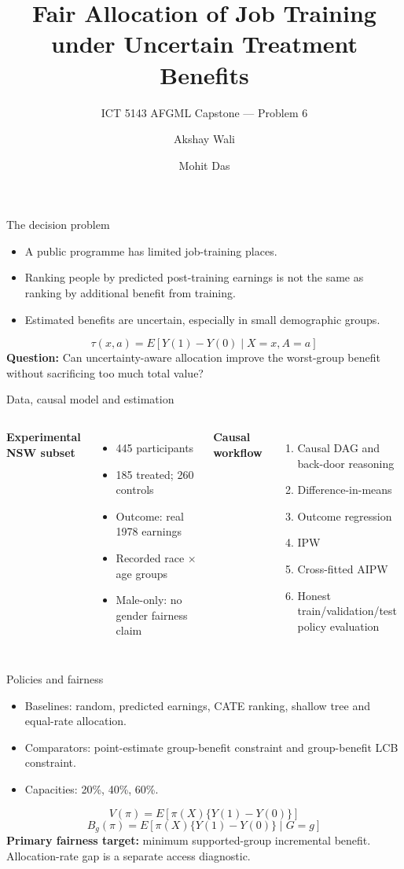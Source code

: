 \documentclass[aspectratio=169,10pt]{beamer}
\title{Fair Allocation of Job Training under Uncertain Treatment Benefits}
\subtitle{ICT 5143 AFGML Capstone — Problem 6}
\author{Akshay Wali \and Mohit Das}
\institute{261090830018 \quad $\vert$ \quad 261090840018}
\date{}
\begin{document}
\begin{frame}
\titlepage
\end{frame}

\begin{frame}{The decision problem}
\begin{itemize}
\item A public programme has limited job-training places.
\item Ranking people by predicted post-training earnings is not the same as ranking by additional benefit from training.
\item Estimated benefits are uncertain, especially in small demographic groups.
\end{itemize}
\vspace{0.4em}
\[
\tau(x,a)=E[Y(1)-Y(0)\mid X=x,A=a]
\]
\centering
\textbf{Question:} Can uncertainty-aware allocation improve the worst-group benefit without sacrificing too much total value?
\end{frame}

\begin{frame}{Data, causal model and estimation}
\begin{columns}[T]
\textbf{Experimental NSW subset}
\begin{itemize}
\item 445 participants
\item 185 treated; 260 controls
\item Outcome: real 1978 earnings
\item Recorded race $\times$ age groups
\item Male-only: no gender fairness claim
\end{itemize}
\textbf{Causal workflow}
\begin{enumerate}
\item Causal DAG and back-door reasoning
\item Difference-in-means
\item Outcome regression
\item IPW
\item Cross-fitted AIPW
\item Honest train/validation/test policy evaluation
\end{enumerate}
\end{columns}
\end{frame}

\begin{frame}{Policies and fairness}
\begin{itemize}
\item Baselines: random, predicted earnings, CATE ranking, shallow tree and equal-rate allocation.
\item Comparators: point-estimate group-benefit constraint and group-benefit LCB constraint.
\item Capacities: 20\%, 40\%, 60\%.
\end{itemize}
\[
V(\pi)=E[\pi(X)\{Y(1)-Y(0)\}]
\]
\[
B_g(\pi)=E[\pi(X)\{Y(1)-Y(0)\}\mid G=g]
\]
\textbf{Primary fairness target:} minimum supported-group incremental benefit. Allocation-rate gap is a separate access diagnostic.
\end{frame}
\end{document}
